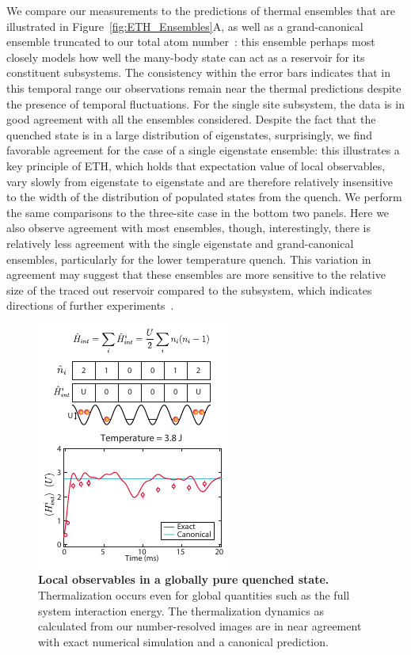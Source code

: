 We compare our measurements to the predictions of thermal ensembles that are illustrated in Figure~\ref{fig:ETH_Ensembles}A, as well as a grand-canonical ensemble truncated to our total atom number~\cite{AppendixA}: this ensemble perhaps most closely models how well the many-body state can act as a reservoir for its constituent subsystems. The consistency within the error bars indicates that in this temporal range our observations remain near the thermal predictions despite the presence of temporal fluctuations. For the single site subsystem, the data is in good agreement with all the ensembles considered. Despite the fact that the quenched state is in a large distribution of eigenstates, surprisingly, we find favorable agreement for the case of a single eigenstate ensemble: this illustrates a key principle of ETH, which holds that expectation value of local observables, vary slowly from eigenstate to eigenstate and are therefore relatively insensitive to the width of the distribution of populated states from the quench. We perform the same comparisons to the three-site case in the bottom two panels. Here we also observe agreement with most ensembles, though, interestingly, there is relatively less agreement with the single eigenstate and grand-canonical ensembles, particularly for the lower temperature quench. This variation in agreement may suggest that these ensembles are more sensitive to the relative size of the traced out reservoir compared to the subsystem, which indicates directions of further experiments~\cite{Rigol2012}.

\begin{figure}[t!]
	\centering
	\includegraphics[scale=1.75]{figures/ETH_Eint.pdf}
	\caption{{\bf Local observables in a globally pure quenched state. } Thermalization occurs even for global quantities such as the full system interaction energy. The thermalization dynamics as calculated from our number-resolved images are in near agreement with exact numerical simulation and a canonical prediction.}
	\label{fig:ETH}
\end{figure}

